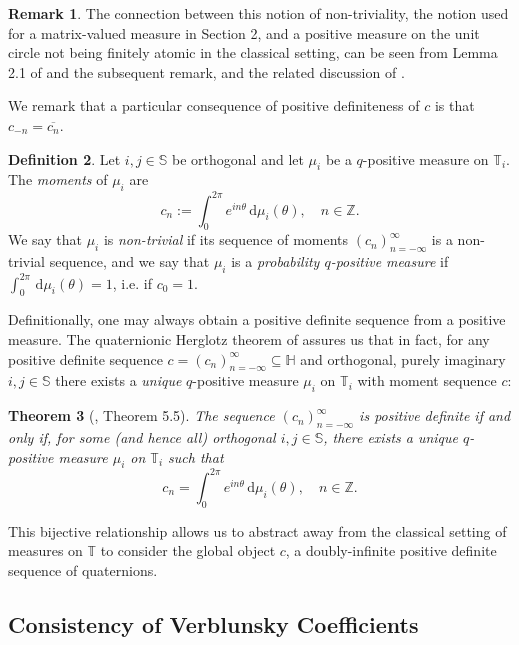 \documentclass[11pt,reqno]{amsart}
\def\th{\theta}
\def\rmd{\mathrm{d}}
\def\ZZ{\mathbb{Z}}
\def\SS{\mathbb{S}}
\def\TT{\mathbb{T}}
\def\HH{\mathbb{H}}
\newtheorem{theorem}{Theorem}[section]
\theoremstyle{definition}
\newtheorem{definition}[theorem]{Definition}
\newtheorem{remark}[theorem]{Remark}
\numberwithin{equation}{section}
\begin{document}
\begin{remark}
    The connection between this notion of non-triviality, the notion used for a matrix-valued measure in Section 2, and a positive measure on the unit circle not being finitely atomic in the classical setting, can be seen from Lemma 2.1 of \cite{DPS08} and the subsequent remark, and the related discussion of \cite{Sim05a}.
\end{remark}

We remark that a particular consequence of positive definiteness of \(c\) is that \(c_{-n} = \overline{c_n}\).

\begin{definition}
    Let \(i,j \in \SS\) be orthogonal and let \(\mu_i\) be a \(q\)-positive measure on \(\TT_i\). The \emph{moments} of \(\mu_i\) are
    \[
        c_n := \int_0^{2\pi} e^{i n \th} \, \rmd \mu_i(\th), \quad n \in \ZZ.
    \]
    We say that \(\mu_i\) is \emph{non-trivial} if its sequence of moments \((c_n)_{n=-\infty}^{\infty}\) is a non-trivial sequence, and we say that \(\mu_i\) is a \emph{probability \(q\)-positive measure} if \(\int_0^{2\pi} \, \rmd\mu_i(\th) = 1\), i.e. if \(c_0 = 1\).
\end{definition}

Definitionally, one may always obtain a positive definite sequence from a positive measure. The quaternionic Herglotz theorem of \cite{ACKS15} assures us that in fact, for any positive definite sequence \(c = (c_n)_{n=-\infty}^{\infty} \subseteq \HH\) and orthogonal, purely imaginary \(i,j \in \SS\) there exists a \emph{unique} \(q\)-positive measure \(\mu_{i}\) on \(\TT_{i}\) with moment sequence \(c\):

\begin{theorem}[\cite{ACKS15}, Theorem 5.5]
    The sequence \((c_n)_{n=-\infty}^{\infty}\) is positive definite if and only if, for some (and hence all) orthogonal \(i,j\in\SS\), there exists a unique \(q\)-positive measure \(\mu_i\) on \(\TT_i\) such that
    \[
        c_n = \int_0^{2\pi} e^{i n \th} \, \rmd\mu_i(\th), \quad n \in \ZZ.
    \]
\end{theorem}

This bijective relationship allows us to abstract away from the classical setting of measures on \(\TT\) to consider the global object \(c\), a doubly-infinite positive definite sequence of quaternions.

\subsection{Consistency of Verblunsky Coefficients}
\label{subsec:ConsistencyVCs}
\end{document}
